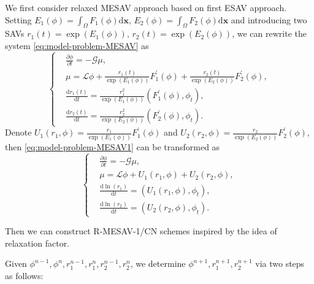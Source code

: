 \documentclass[final,review,onefignum,onetabnum]{siamart190516}
\theoremstyle{plain}
\begin{document}
 
 We first consider relaxed MESAV approach based on first ESAV approach. 
 Setting $E_{1}(\phi)=\int_{\Omega} F_{1}(\phi) \mathrm{d} \boldsymbol{x},\, E_{2}(\phi)=\int_{\Omega} F_{2}(\phi) \mathrm{d} \boldsymbol{x}$ and introducing two SAVs $r_{1}(t)=\exp\left(E_{1}(\phi)\right),\, r_{2}(t)=\exp\left(E_{2}(\phi)\right)$, we can rewrite the system \eqref{eq:model-problem-MESAV} as
 \begin{equation} \label{eq:model-problem-MESAV1}
	\left\{\begin{aligned}
		& \frac{\partial \phi}{\partial t}=-\mathcal{G} \mu, \\
		& \mu=\mathcal{L} \phi+ \frac{r_{1}(t)}{\exp\left(E_{1}(\phi)\right)}F_{1}^{\prime}(\phi) + \frac{r_{2}(t)}{\exp\left(E_{2}(\phi)\right)}F_{2}^{\prime}(\phi),\\
		& \frac{\mathrm{d} r_{1}(t)}{\mathrm{d} t}=\frac{r_{1}^{2}}{\exp \left(E_{1}(\phi)\right)} \left( F_{1}^{\prime}(\phi), \phi_{t} \right), \\
		& \frac{\mathrm{d} r_{2}(t)}{\mathrm{d} t}=\frac{r_{2}^{2}}{\exp \left(E_{2}(\phi)\right)} \left( F_{2}^{\prime}(\phi), \phi_{t} \right).
	\end{aligned}\right.
\end{equation}
Denote $U_{1}(r_{1}, \phi)=\frac{r_{1}}{\exp \left(E_{1}(\phi)\right)} F_{1}^{\prime}(\phi)$ and $U_{2}(r_{2}, \phi)=\frac{r_{2}}{\exp \left(E_{2}(\phi)\right)} F_{2}^{\prime}(\phi)$, then \eqref{eq:model-problem-MESAV1} can be transformed as 
\begin{equation}
\left\{\begin{aligned}\label{eq:gradient-flow-MESAV} 
&\frac{\partial \phi}{\partial t} =-\mathcal{G} \mu, \\ 
&\mu =\mathcal{L} \phi+U_{1}(r_{1}, \phi)+U_{2}(r_{2}, \phi), \\ 
&\frac{\mathrm{d} \ln (r_{1})}{\mathrm{d} t}=\left(U_{1}(r_{1}, \phi), \phi_{t}\right), \\
&\frac{\mathrm{d} \ln (r_{2})}{\mathrm{d} t}=\left(U_{2}(r_{2}, \phi), \phi_{t}\right).
\end{aligned}\right.
\end{equation}

Then we can construct R-MESAV-1/CN schemes inspired by the idea of relaxation factor.

Given $\phi^{n-1}, \phi^{n}, r_{1}^{n-1}, r_{1}^{n}, r_{2}^{n-1}, r_{2}^{n}$, we determine $\phi^{n+1}, r_{1}^{n+1}, r_{2}^{n+1}$ via two steps as follows:
\end{document}
